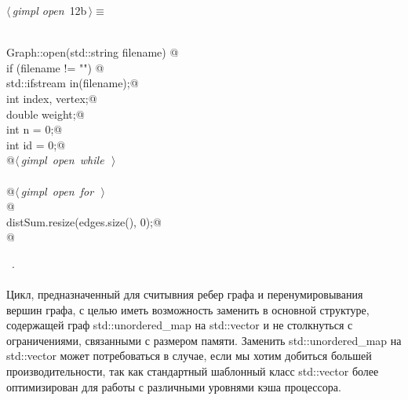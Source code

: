 \documentclass[12pt]{article}
\begin{document}
\begin{flushleft} \small
\begin{minipage}{\linewidth}\label{scrap23}\raggedright\small
{} $\langle\,${\itshape gimpl open}\nobreak\ {\footnotesize {12b}}$\,\rangle\equiv$
\vspace{-1ex}
\begin{list}{}{} \item
\mbox{}\verb@@\\
\mbox{}\verb@void Graph::open(std::string filename) {@\\
\mbox{}\verb@    if (filename != "") {@\\
\mbox{}\verb@        std::ifstream in(filename);@\\
\mbox{}\verb@        int index, vertex;@\\
\mbox{}\verb@        double weight;@\\
\mbox{}\verb@        int n = 0;@\\
\mbox{}\verb@        int id = 0;@\\
\mbox{}\verb@        @\hbox{$\langle\,${\itshape gimpl open while}\nobreak\ {\footnotesize {}}$\,\rangle$}\verb@@\\
\mbox{}\verb@@\\
\mbox{}\verb@        @\hbox{$\langle\,${\itshape gimpl open for}\nobreak\ {\footnotesize {}}$\,\rangle$}\verb@@\\
\mbox{}\verb@    }@\\
\mbox{}\verb@    distSum.resize(edges.size(), 0);@\\
\mbox{}\verb@} @\\
\mbox{}\verb@@{\NWsep}
\end{list}
\vspace{-1.5ex}
\footnotesize
\begin{list}{}{\setlength{\itemsep}{-\parsep}\setlength{\itemindent}{-\leftmargin}}
\item \NWtxtMacroRefIn\ .

\item{}
\end{list}
\end{minipage}\vspace{4ex}
\end{flushleft}
\paragraph{}
Цикл, предназначенный для считывния ребер графа и перенумировывания вершин графа, 
с целью иметь возможность заменить в основной структуре, содержащей граф std::unordered\_map на std::vector
и не столкнуться с ограничениями, связанными с размером памяти. Заменить std::unordered\_map на std::vector может
потребоваться в случае, если мы хотим добиться большей производительности, так как стандартный шаблонный класс
std::vector более оптимизирован для работы с различными уровнями кэша процессора.
\end{document}
